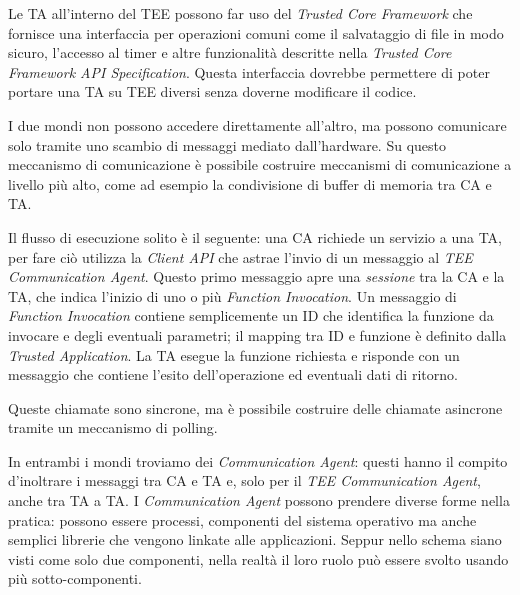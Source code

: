 \documentclass[12pt,italian]{report}
\begin{document}
Le TA all'interno del TEE possono far uso del \textit{Trusted Core Framework}
che fornisce una interfaccia per operazioni comuni come il salvataggio
di file in modo sicuro, l'accesso al timer e altre funzionalità descritte
nella
\textit{Trusted Core Framework API Specification}\cite{gp2020internalapi}.
Questa interfaccia dovrebbe permettere di poter portare una TA su TEE diversi
senza doverne modificare il codice.

I due mondi non possono accedere direttamente all'altro, ma possono
comunicare solo tramite uno scambio di messaggi mediato dall'hardware.
Su questo meccanismo di comunicazione è possibile costruire meccanismi di
comunicazione a livello più alto, come ad esempio la condivisione di buffer
di memoria tra CA e TA.

\bigbreak \noindent

Il flusso di esecuzione solito è il seguente: una CA richiede un servizio a
una TA, per fare ciò utilizza la \textit{Client API} che astrae l'invio di un
messaggio al \textit{TEE Communication Agent}.
Questo primo messaggio apre una \textit{sessione} tra la CA e la TA, che
indica l'inizio di uno o più \textit{Function Invocation}.
Un messaggio di \textit{Function Invocation} contiene semplicemente un ID
che identifica la funzione da invocare e degli eventuali parametri;
il mapping tra ID e funzione è definito dalla \textit{Trusted Application}.
La TA esegue la funzione richiesta e risponde con un messaggio che contiene
l'esito dell'operazione ed eventuali dati di ritorno.

Queste chiamate sono sincrone, ma è possibile costruire delle chiamate
asincrone tramite un meccanismo di polling.

In entrambi i mondi troviamo dei \textit{Communication Agent}: questi 
hanno il compito d'inoltrare i messaggi tra CA e TA e, solo per il
\textit{TEE Communication Agent}, anche tra TA a TA.
I \textit{Communication Agent} possono prendere diverse forme nella pratica:
possono essere processi, componenti del sistema operativo ma anche semplici
librerie che vengono linkate alle applicazioni.
Seppur nello schema siano visti come solo due componenti, nella realtà il loro
ruolo può essere svolto usando più sotto-componenti.

\bigbreak
\end{document}
